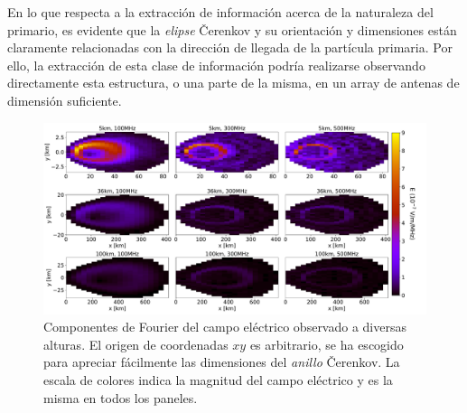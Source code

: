 \documentclass[11 pt, a4paper]{article} %
\numberwithin{equation}{section}
\numberwithin{figure}{section}
\numberwithin{table}{section}
\begin{document}
En lo que respecta a la extracción de información acerca de la naturaleza del primario, es evidente que la \textit{elipse} \v{C}erenkov y su orientación y dimensiones están claramente relacionadas con la dirección de llegada de la partícula primaria. Por ello, la extracción de esta clase de información podría realizarse observando directamente esta estructura, o una parte de la misma, en un array de antenas de dimensión suficiente. 
\begin{figure}[H]
		\centering
		\includegraphics[width=.95\linewidth]{figures/Radio_UG/85deg_varh_5_36_100}
		\caption{Componentes de Fourier del campo eléctrico observado a diversas alturas. El origen de coordenadas $xy$ es arbitrario, se ha escogido para apreciar fácilmente las dimensiones del \textit{anillo} \v{C}erenkov. La escala de colores indica la magnitud del campo eléctrico y es la misma en todos los paneles.}
		\label{85deg_varh_536100}
	\end{figure}
\end{document}
